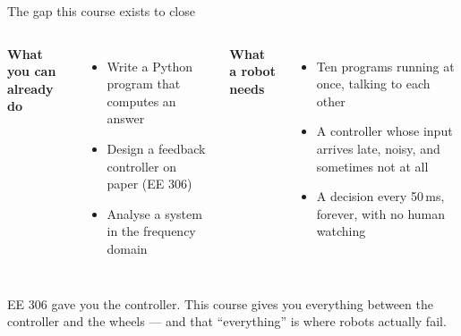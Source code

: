 \documentclass[aspectratio=169]{beamer}
\begin{document}
\begin{frame}{The gap this course exists to close}
  \begin{columns}[T,onlytextwidth]
    \textbf{What you can already do}
    \begin{itemize}\footnotesize
      \item Write a Python program that computes an answer
      \item Design a feedback controller on paper (EE 306)
      \item Analyse a system in the frequency domain
    \end{itemize}

    \textbf{What a robot needs}
    \begin{itemize}\footnotesize
      \item Ten programs running at once, talking to each other
      \item A controller whose input arrives late, noisy, and sometimes not at all
      \item A decision every 50\,ms, forever, with no human watching
    \end{itemize}
  \end{columns}

  \vspace{1.0em}
  \begin{underhood}
    \footnotesize
    EE 306 gave you the controller. This course gives you everything between the controller
    and the wheels --- and that ``everything'' is where robots actually fail.
  \end{underhood}
\end{frame}
\end{document}
